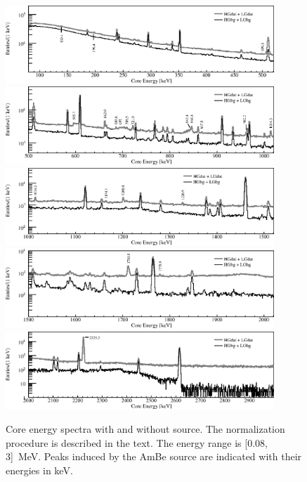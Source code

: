 \begin{figure}[tbhp]
  \centering
  \includegraphics[width=0.9\textwidth,clip]{spectra_0_520keV}
  \includegraphics[width=0.9\textwidth,clip]{spectra_500_1020keV}
  \includegraphics[width=0.9\textwidth,clip]{spectra_1000_1520keV}
  \includegraphics[width=0.9\textwidth,clip]{spectra_1500_2020keV}
  \includegraphics[width=0.9\textwidth,clip]{spectra_2_3MeV}
  \caption{Core energy spectra with and without source. The
    normalization procedure is described in the text. The energy range
    is [0.08, 3]~MeV. Peaks induced by the AmBe source are indicated
    with their energies in keV.}
  \label{fig:neu:spec}
\end{figure}

